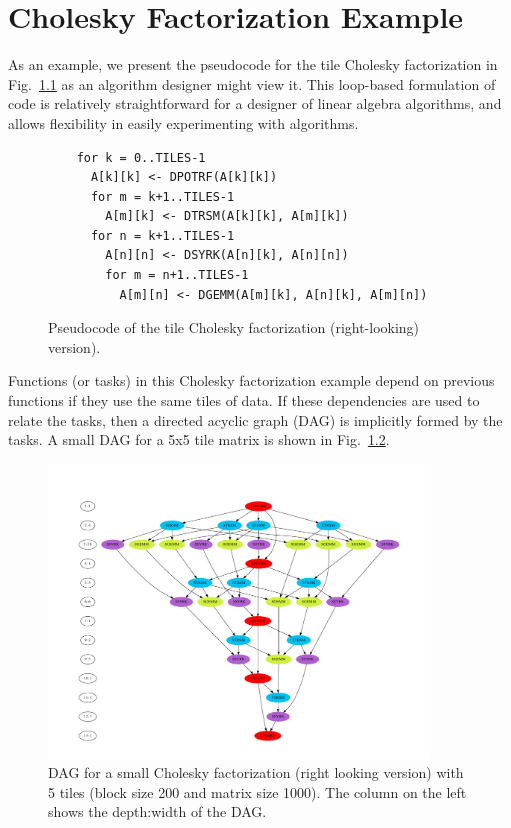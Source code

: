 \documentclass[11pt,letterpaper]{report}
\begin{document}

\chapter{Cholesky Factorization Example}

As an example, we present the pseudocode for the tile Cholesky
factorization in Fig.~\ref{fig:tileCholesky} as an algorithm designer
might view it.  This loop-based formulation of code is relatively
straightforward for a designer of linear algebra algorithms, and
allows flexibility in easily experimenting with algorithms.
\begin{figure}[bt]
  \centering
  \scriptsize
  \begin{lstlisting}
    for k = 0..TILES-1
      A[k][k] <- DPOTRF(A[k][k])
      for m = k+1..TILES-1
        A[m][k] <- DTRSM(A[k][k], A[m][k])
      for n = k+1..TILES-1
        A[n][n] <- DSYRK(A[n][k], A[n][n])
        for m = n+1..TILES-1
          A[m][n] <- DGEMM(A[m][k], A[n][k], A[m][n])
  \end{lstlisting}
  \caption{Pseudocode of the tile Cholesky factorization (right-looking) version).}
  \label{fig:tileCholesky}
\end{figure}
Functions (or tasks) in this Cholesky factorization example depend on
previous functions if they use the same tiles of data.  If these
dependencies are used to relate the tasks, then a directed acyclic
graph (DAG) is implicitly formed by the tasks.  A small DAG for a 5x5
tile matrix is shown in Fig.~\ref{fig:DAG-Cholesky-5}.
\begin{figure}[tb]
  \centering
  \includegraphics[width=0.9\textwidth]{dag-cholesky-5tile}
  \caption{DAG for a small Cholesky factorization (right looking
    version) with 5 tiles (block size 200 and matrix size 1000).  The
    column on the left shows the depth:width of the DAG. }
  \label{fig:DAG-Cholesky-5}
\end{figure}
\end{document}
